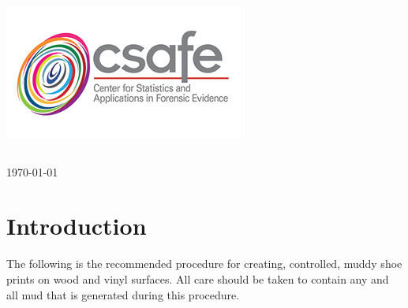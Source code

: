 \begin{titlepage}

\includegraphics[scale=.5]{Logo}\\[1cm]

\begin{center}
\begin{tabular}{ c   |   c } 
 
\end{tabular}
\end{center}

{\large \today}\\[2cm] %


 

\vfill %

\end{titlepage}
 
\tableofcontents

\newpage

\section{Introduction}

The following is the recommended procedure for creating, controlled, muddy shoe prints on wood and vinyl surfaces. All care should be taken to contain any and all mud that is generated during this procedure. 

